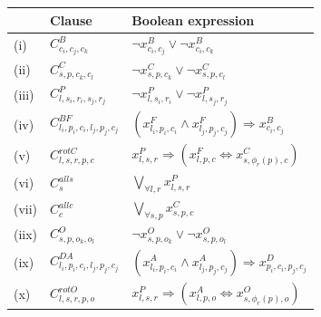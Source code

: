 \begin{table}[h!]
    \centering
    \begin{tabular}{|l|l|l|}
        \hline
        & Clause & Boolean expression \\ [0.5ex] 
        \hline
        \hline
        (i) & \(C^{B}_{c_i,c_j,c_k}\) & \(\neg x_{c_i,c_j}^{B} \lor \neg x_{c_i,c_k}^{B}\) \\ %
        (ii) &  \(C^{C}_{s,p,c_k,c_l}\) & \(\neg x_{s, p, c_k}^{C} \lor \neg x_{s, p, c_l}^{C}\) \\ %
        (iii) & \(C^{P}_{l, s_i, r_i, s_j, r_j}\)  & \(\neg x_{l,s_i,r_i}^{P} \lor \neg x_{l,s_j,r_j}^{P} \) \\ %
        (iv) & \(C^{BF}_{l_i,p_i,c_i,l_j,p_j,c_j}\) & \(\left(x_{l_i,p_i,c_i}^{F} \land x_{l_j,p_j,c_j}^{F} \right) \Rightarrow x_{c_i,c_j}^{B}\) \\ %
        (v) & \(C^{rotC}_{l,s,r,p,c}\) & \(x_{l,s,r}^{P} \Rightarrow \left(x_{l,p,c}^{F} \Leftrightarrow x_{s, \phi_r(p), c}^{C}\right)\) \\ %
        (vi) & \(C^{all s}_{s}\)  & \(\bigvee_{\forall l, r} x_{l,s,r}^{P}\) \\ %
        (vii) & \(C^{all c}_{c}\)  & \(\bigvee_{\forall s, p} x_{s,p,c}^{C}\) \\ %
        (iix) &  \(C^{O}_{s,p,o_k,o_l}\) & \(\neg x_{s, p, o_k}^{O} \lor \neg x_{s, p, o_l}^{O}\) \\ %
        (ix) & \(C^{DA}_{l_i,p_i,c_i,l_j,p_j,c_j}\) & \(\left(x_{l_i,p_i,c_i}^{A} \land x_{l_j,p_j,c_j}^{A} \right) \Rightarrow x_{p_i,c_i,p_j,c_j}^{D}\) \\ %
        (x) & \(C^{rotO}_{l,s,r,p,o}\) & \(x_{l,s,r}^{P} \Rightarrow \left(x_{l,p,o}^{A} \Leftrightarrow x_{s, \phi_r(p), o}^{O}\right)\) \\ %
        \hline
    \end{tabular}

\end{table}
